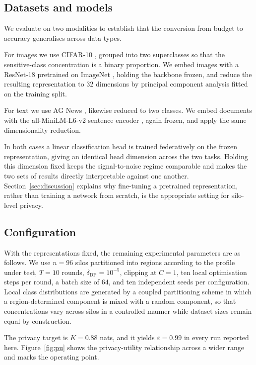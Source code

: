 \documentclass[acmsmall,screen,review,anonymous]{acmart}
\theoremstyle{acmdefinition}%
\begin{document}
\subsection{Datasets and models}

We evaluate on two modalities to establish that the conversion from budget to
accuracy generalises across data types.

For images we use CIFAR-10 \cite{krizhevsky2009cifar}, grouped into two
superclasses so that the sensitive-class concentration is a binary proportion. We
embed images with a ResNet-18 \cite{he2016resnet} pretrained on ImageNet
\cite{deng2009imagenet}, holding the backbone frozen, and reduce the resulting
representation to $32$ dimensions by principal component analysis fitted on the
training split.

For text we use AG News \cite{zhang2015agnews}, likewise reduced to two classes.
We embed documents with the all-MiniLM-L6-v2 sentence encoder
\cite{reimers2019sentencebert,wang2020minilm}, again frozen, and apply the same
dimensionality reduction.

In both cases a linear classification head is trained federatively on the frozen
representation, giving an identical head dimension across the two tasks. Holding
this dimension fixed keeps the signal-to-noise regime comparable and makes the
two sets of results directly interpretable against one another.
Section~\ref{sec:discussion} explains why fine-tuning a pretrained representation,
rather than training a network from scratch, is the appropriate setting for
silo-level privacy.

\subsection{Configuration}

With the representations fixed, the remaining experimental parameters are as
follows. We use $n = 96$ silos partitioned into regions according to the profile
under test, $T = 10$ rounds, $\delta_{\mathrm{DP}} = 10^{-5}$, clipping at $C = 1$,
ten local optimisation steps per round, a batch size of $64$, and ten independent
seeds per configuration. Local class distributions are generated by a coupled
partitioning scheme in which a region-determined component is mixed with a random
component, so that concentrations vary across silos in a controlled manner while
dataset sizes remain equal by construction.

The privacy target is $K = 0.88$ nats, and it yields $\varepsilon = 0.99$ in every
run reported here. Figure~\ref{fig:pu} shows the privacy-utility relationship
across a wider range and marks the operating point.
\end{document}
